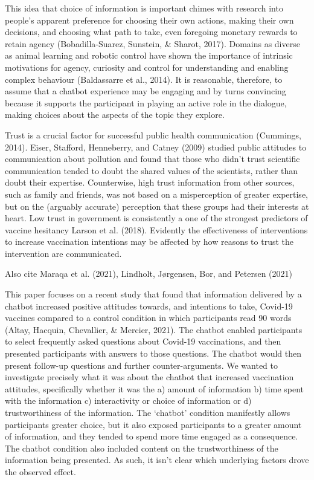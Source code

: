 \documentclass[
  english,
  ,jou,floatsintext]{apa6}
\begin{document}
This idea that choice of information is important chimes with research into people's apparent preference for choosing their own actions, making their own decisions, and choosing what path to take, even foregoing monetary rewards to retain agency (Bobadilla-Suarez, Sunstein, \& Sharot, 2017). Domains as diverse as animal learning and robotic control have shown the importance of intrinsic motivations for agency, curiosity and control for understanding and enabling complex behaviour (Baldassarre et al., 2014). It is reasonable, therefore, to assume that a chatbot experience may be engaging and by turns convincing because it supports the participant in playing an active role in the dialogue, making choices about the aspects of the topic they explore.

Trust is a crucial factor for successful public health communication (Cummings, 2014). Eiser, Stafford, Henneberry, and Catney (2009) studied public attitudes to communication about pollution and found that those who didn't trust scientific communication tended to doubt the shared values of the scientists, rather than doubt their expertise. Counterwise, high trust information from other sources, such as family and friends, was not based on a misperception of greater expertise, but on the (arguably accurate) perception that these groups had their interests at heart. Low trust in government is consistently a one of the strongest predictors of vaccine hesitancy Larson et al. (2018). Evidently the effectiveness of interventions to increase vaccination intentions may be affected by how reasons to trust the intervention are communicated.

Also cite Maraqa et al. (2021), Lindholt, Jørgensen, Bor, and Petersen (2021)

This paper focuses on a recent study that found that information delivered by a chatbot increased positive attitudes towards, and intentions to take, Covid-19 vaccines compared to a control condition in which participants read 90 words (Altay, Hacquin, Chevallier, \& Mercier, 2021). The chatbot enabled participants to select frequently asked questions about Covid-19 vaccinations, and then presented participants with answers to those questions. The chatbot would then present follow-up questions and further counter-arguments. We wanted to investigate precisely what it was about the chatbot that increased vaccination attitudes, specifically whether it was the a) amount of information b) time spent with the information c) interactivity or choice of information or d) trustworthiness of the information. The `chatbot' condition manifestly allows participants greater choice, but it also exposed participants to a greater amount of information, and they tended to spend more time engaged as a consequence. The chatbot condition also included content on the trustworthiness of the information being presented. As such, it isn't clear which underlying factors drove the observed effect.
\end{document}
